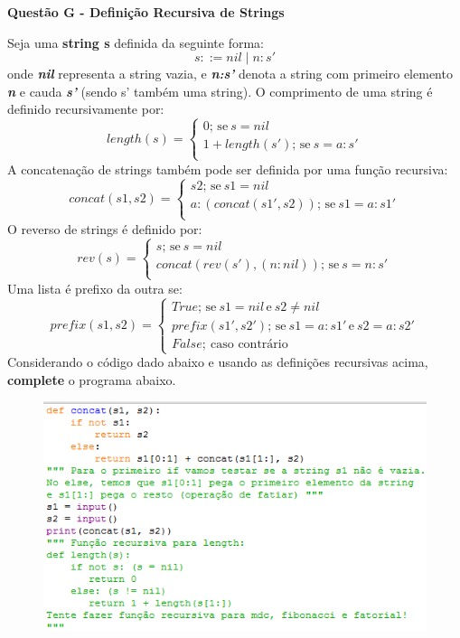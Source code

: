 \documentclass[a4paper, 12pt]{article}
\begin{document}
\newpage %
\begin{center}
\textbf{{\Large Questão G - Definição Recursiva de Strings}}
\end{center}
\vspace{5pt}
Seja uma \textbf{string s} definida da seguinte forma: $$s::= nil \mid n:s' $$onde \textbf{\textit{nil}} representa a string vazia, e \textbf{\textit{n:s'}} denota a string com primeiro elemento \textbf{\textit{n}} e cauda \textbf{\textit{s'}} (sendo s' também uma string). \newline 
O comprimento de uma string é definido recursivamente por:
$$length(s) =
		\begin{cases}
			0;\, \textrm{se}\ s = nil \\
			1 + length(s');\, \textrm{se}\ s = a:s' \\
		\end{cases}
$$
A concatenação de strings também pode ser definida por uma função recursiva:
$$concat(s1,s2) =
		\begin{cases}
			s2;\, \textrm{se}\ s1 = nil \\
			a:(concat(s1',s2));\, \textrm{se}\ s1 = a:s1' \\
		\end{cases}
$$
O reverso de strings é definido por:
$$rev(s) =
		\begin{cases}
			s;\, \textrm{se}\ s = nil \\
			concat(rev(s'), (n:nil));\, \textrm{se}\ s = n:s' \\
		\end{cases}
$$
Uma lista é prefixo da outra se:
$$prefix(s1,s2) =
		\begin{cases}
			True;\, \textrm{se}\ s1 = nil\, \textrm{e}\  s2 \neq nil\\
			prefix(s1', s2');\, \textrm{se}\ s1 = a:s1'\, \textrm{e}\ s2 = a:s2' \\
			False;\ \textrm{caso contrário}
		\end{cases}
$$
Considerando o código dado abaixo e usando as definições recursivas acima, \textbf{complete} o programa abaixo.
\begin{figure}[H]
	\centering
	\includegraphics[scale=0.75]{strings.png}
\end{figure}
\end{document}
